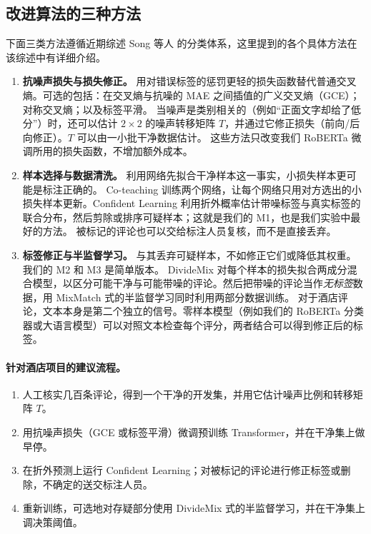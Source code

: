\documentclass[11pt,a4paper]{article}
\begin{document}
\subsection{改进算法的三种方法}
下面三类方法遵循近期综述 Song 等人\cite{song2023learning} 的分类体系，这里提到的各个具体方法在该综述中有详细介绍。
\begin{enumerate}
  \item \textbf{抗噪声损失与损失修正。} 用对错误标签的惩罚更轻的损失函数替代普通交叉熵。可选的包括：在交叉熵与抗噪的 MAE 之间插值的广义交叉熵（GCE）；对称交叉熵；以及标签平滑。
  当噪声是类别相关的（例如``正面文字却给了低分''）时，还可以估计 $2\times2$ 的噪声转移矩阵 $T$，并通过它修正损失（前向/后向修正）。$T$ 可以由一小批干净数据估计。
  这些方法只改变我们 RoBERTa 微调所用的损失函数，不增加额外成本。

  \item \textbf{样本选择与数据清洗。} 利用网络先拟合干净样本这一事实，小损失样本更可能是标注正确的。
  Co-teaching 训练两个网络，让每个网络只用对方选出的小损失样本更新。Confident Learning 利用折外概率估计带噪标签与真实标签的联合分布，然后剪除或排序可疑样本\cite{northcutt2021confident}；这就是我们的 M1，也是我们实验中最好的方法。
  被标记的评论也可以交给标注人员复核，而不是直接丢弃。

  \item \textbf{标签修正与半监督学习。} 与其丢弃可疑样本，不如修正它们或降低其权重。我们的 M2 和 M3 是简单版本。
  DivideMix 对每个样本的损失拟合两成分混合模型，以区分可能干净与可能带噪的评论。然后把带噪的评论当作\emph{无标签}数据，用 MixMatch 式的半监督学习同时利用两部分数据训练。
  对于酒店评论，文本本身是第二个独立的信号。零样本模型（例如我们的 RoBERTa 分类器或大语言模型）可以对照文本检查每个评分，两者结合可以得到修正后的标签。
\end{enumerate}

\paragraph{针对酒店项目的建议流程。}
\begin{enumerate}
  \item 人工核实几百条评论，得到一个干净的开发集，并用它估计噪声比例和转移矩阵 $T$。
  \item 用抗噪声损失（GCE 或标签平滑）微调预训练 Transformer，并在干净集上做早停。
  \item 在折外预测上运行 Confident Learning；对被标记的评论进行修正标签或删除，不确定的送交标注人员。
  \item 重新训练，可选地对存疑部分使用 DivideMix 式的半监督学习，并在干净集上调决策阈值。
\end{enumerate}
\end{document}
